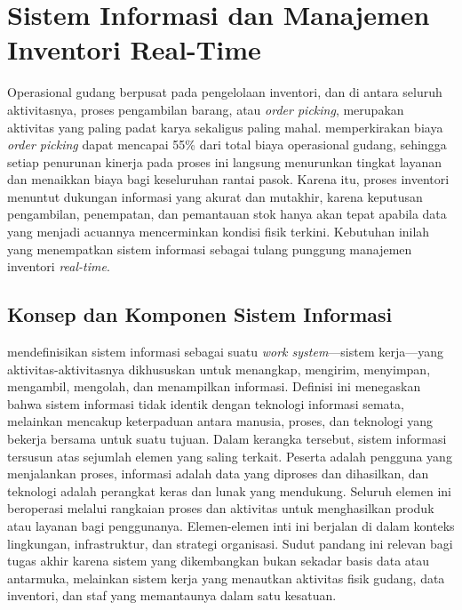 \section{Sistem Informasi dan Manajemen Inventori Real-Time}
\label{sec:sistem-informasi}

Operasional gudang berpusat pada pengelolaan inventori, dan di antara seluruh aktivitasnya, proses pengambilan barang, atau \textit{order picking}, merupakan aktivitas yang paling padat karya sekaligus paling mahal. \textcite{dekoster2007} memperkirakan biaya \textit{order picking} dapat mencapai 55\% dari total biaya operasional gudang, sehingga setiap penurunan kinerja pada proses ini langsung menurunkan tingkat layanan dan menaikkan biaya bagi keseluruhan rantai pasok. Karena itu, proses inventori menuntut dukungan informasi yang akurat dan mutakhir, karena keputusan pengambilan, penempatan, dan pemantauan stok hanya akan tepat apabila data yang menjadi acuannya mencerminkan kondisi fisik terkini. Kebutuhan inilah yang menempatkan sistem informasi sebagai tulang punggung manajemen inventori \textit{real-time}.

\subsection{Konsep dan Komponen Sistem Informasi}

\textcite{alter2008} mendefinisikan sistem informasi sebagai suatu \textit{work system}---sistem kerja---yang aktivitas-aktivitasnya dikhususkan untuk menangkap, mengirim, menyimpan, mengambil, mengolah, dan menampilkan informasi. Definisi ini menegaskan bahwa sistem informasi tidak identik dengan teknologi informasi semata, melainkan mencakup keterpaduan antara manusia, proses, dan teknologi yang bekerja bersama untuk suatu tujuan. Dalam kerangka tersebut, sistem informasi tersusun atas sejumlah elemen yang saling terkait. Peserta adalah pengguna yang menjalankan proses, informasi adalah data yang diproses dan dihasilkan, dan teknologi adalah perangkat keras dan lunak yang mendukung. Seluruh elemen ini beroperasi melalui rangkaian proses dan aktivitas untuk menghasilkan produk atau layanan bagi penggunanya. Elemen-elemen inti ini berjalan di dalam konteks lingkungan, infrastruktur, dan strategi organisasi. Sudut pandang ini relevan bagi tugas akhir karena sistem yang dikembangkan bukan sekadar basis data atau antarmuka, melainkan sistem kerja yang menautkan aktivitas fisik gudang, data inventori, dan staf yang memantaunya dalam satu kesatuan.


